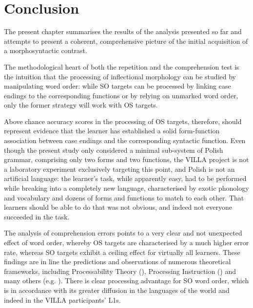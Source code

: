 \chapter{Conclusion}\label{sec:8}

The present chapter summarises the results of the analysis presented so far and attempts to present a coherent, comprehensive picture of the initial acquisition of a morphosyntactic contrast.

The methodological heart of both the repetition and the comprehension test is the intuition that the processing of inflectional morphology can be studied by manipulating word order: while SO targets can be processed by linking case endings to the corresponding functions or by relying on unmarked word order, only the former strategy will work with OS targets. 

Above chance accuracy scores in the processing of OS targets, therefore, should represent evidence that the learner has established a solid form-function association between case endings and the corresponding syntactic function. Even though the present study only considered a minimal sub-system of Polish grammar, comprising only two forms and two functions, the VILLA project is not a laboratory experiment exclusively targeting this point, and Polish is not an artificial language: the learner’s task, while apparently easy, had to be performed while breaking into a completely new language, characterised by exotic phonology and vocabulary and dozens of forms and functions to match to each other. That learners should be able to do that was not obvious, and indeed not everyone succeeded in the task. 

The analysis of comprehension errors points to a very clear and not unexpected effect of word order, whereby OS targets are characterised by a much higher error rate, whereas SO targets exhibit a ceiling effect for virtually all learners. These findings are in line the predictions and observations of numerous theoretical frameworks, including Processability Theory (\citealt{Pienemann1998, Baten2013, ArtoniMagnani2015}), Processing Instruction (\citealt{VanPatten1984, VanPatten1996, VanPattenEtAl2013}) and many others (e.g. \citealt{KempeMacWhinney1998, Jackson2007, HenryEtAl2009, Rankin2014}). There is clear processing advantage for SO word order, which is in accordance with its greater diffusion in the languages of the world and indeed in the VILLA participants’ L1s.

